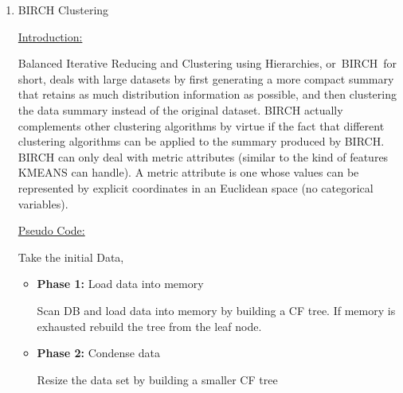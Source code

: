 \documentclass[12pt]{article}
\renewcommand{\_}{\kern-1.5pt\textunderscore\kern-1.5pt}
\begin{document}
\begin{enumerate}
	\item {\fontsize{20pt}{24.0pt}\selectfont BIRCH Clustering\par}\par

{\fontsize{14pt}{16.8pt}\selectfont \uline{Introduction:}\par}\par

Balanced Iterative Reducing and Clustering using Hierarchies, or BIRCH for short, deals with large datasets by first generating a more compact summary that retains as much distribution information as possible, and then clustering the data summary instead of the original dataset. BIRCH actually complements other clustering algorithms by virtue if the fact that different clustering algorithms can be applied to the summary produced by BIRCH. BIRCH can only deal with metric attributes (similar to the kind of features KMEANS can handle). A metric attribute is one whose values can be represented by explicit coordinates in an Euclidean space (no categorical variables).\par

{\fontsize{14pt}{16.8pt}\selectfont \uline{Pseudo Code:}\par}\par

Take the initial Data, \par

\setlength{\parskip}{7.44pt}
\begin{itemize}
	\item {\fontsize{11pt}{13.2pt}\selectfont \textbf{\textcolor[HTML]{333333}{Phase 1:}}\textcolor[HTML]{333333}{ Load data into memory}\par}\par

{\fontsize{11pt}{13.2pt}\selectfont \textcolor[HTML]{333333}{Scan DB and load data into memory by building a CF tree. If memory is exhausted rebuild the tree from the leaf node.}\par}\par

	\item {\fontsize{11pt}{13.2pt}\selectfont \textbf{\textcolor[HTML]{333333}{Phase 2:}}\textcolor[HTML]{333333}{ Condense data}\par}\par

{\fontsize{11pt}{13.2pt}\selectfont \textcolor[HTML]{333333}{Resize the data set by building a smaller CF tree}\par}\par


\end{itemize}
\end{enumerate}
\end{document}
